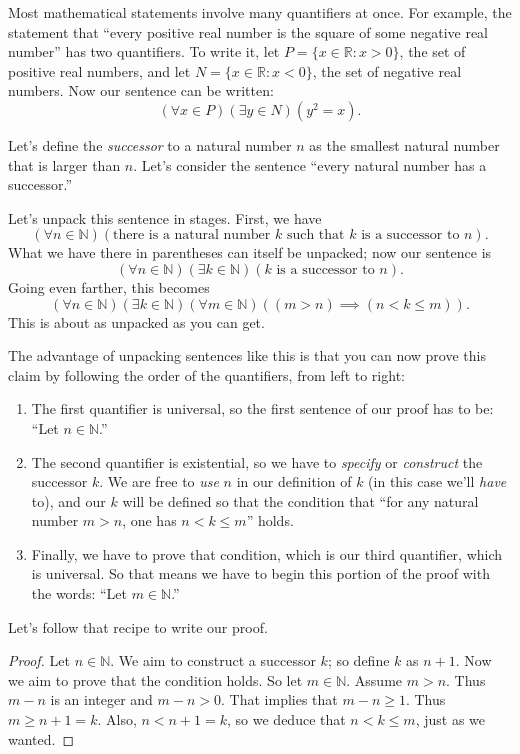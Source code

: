 \documentclass[11pt,dvipsnames]{book}
\numberwithin{figure}{section} %
\numberwithin{table}{section} %
\begin{document}
Most mathematical statements involve many quantifiers at once.
For example, the statement that ``every positive real number is the square of some negative real number'' has two quantifiers.
To write it, let $P = \{ x \in \mathbb{R} : x > 0\}$, the set of positive real numbers, and let $N = \{ x \in \mathbb{R} : x < 0\}$, the set of negative real numbers.
Now our sentence can be written:
\[
    (\forall x \in P)(\exists y \in N)(y^2 = x).
\]
\begin{example}
    Let's define the \emph{successor} to a natural number $n$ as the smallest natural number that is larger than $n$.
    Let's consider the sentence ``every natural number has a successor.''

    Let's unpack this sentence in stages.
    First, we have
    \[
        (\forall n \in \mathbb{N})(\text{there is a natural number $k$ such that $k$ is a successor to $n$}).
    \]
    What we have there in parentheses can itself be unpacked;
    now our sentence is
    \[
        (\forall n \in \mathbb{N})(\exists k \in \mathbb{N})(\text{$k$ is a successor to $n$}).
    \]
    Going even farther, this becomes
    \[
        (\forall n \in \mathbb{N})(\exists k \in \mathbb{N})(\forall m \in \mathbb{N})((m>n) \implies (n<k\leq m)).
    \]
    This is about as unpacked as you can get.

    The advantage of unpacking sentences like this is that you can now prove this claim by following the order of the quantifiers, from left to right:
    \begin{enumerate}[label=(\alph*)]
        \item The first quantifier is universal, so the first sentence of our proof has to be: ``Let $n \in \mathbb{N}$.''
        \item The second quantifier is existential, so we have to \emph{specify} or \emph{construct} the successor $k$. We are free to \emph{use} $n$ in our definition of $k$ (in this case we'll \emph{have} to), and our $k$ will be defined so that the condition that ``for any natural number $m>n$, one has $n<k\leq m$'' holds.
        \item Finally, we have to prove that condition, which is our third quantifier, which is universal. So that means we have to begin this portion of the proof with the words: ``Let $m \in \mathbb{N}$.''
    \end{enumerate}

    Let's follow that recipe to write our proof.
    \begin{proof}
        Let $n \in \mathbb{N}$.
        We aim to construct a successor $k$;
        so define $k$ as $n+1$.
        Now we aim to prove that the condition holds.
        So let $m \in \mathbb{N}$.
        Assume $m > n$.
        Thus $m - n$ is an integer and $m-n>0$.
        That implies that $m-n\geq 1$.
        Thus $m \geq n+1=k$.
        Also, $n< n+1=k$, so we deduce that $n< k \leq m$, just as we wanted.
    \end{proof}
\end{example}
\end{document}
